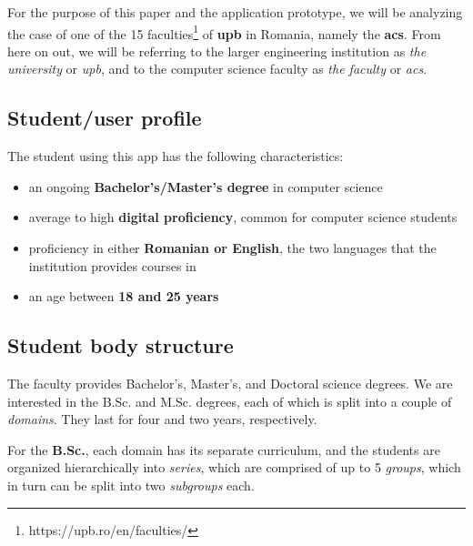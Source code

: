     For the purpose of this paper and the application prototype, we will be analyzing the case of one of the 15 faculties\footnote{https://upb.ro/en/faculties/} of \textbf{\acrlong{upb}} in Romania, namely the \textbf{\acrlong{acs}}. From here on out, we will be referring to the larger engineering institution as \textit{the university} or \textit{\acrshort{upb}}, and to the computer science faculty as \textit{the faculty} or \textit{\acrshort{acs}}.
    
    \subsection{Student/user profile} \label{2:student_profile}
    
        The student using this app has the following characteristics:
        \begin{itemize}
            \setlength{\topsep}{0.5pt}
            \setlength{\itemsep}{0.5pt}
            \setlength{\parsep}{0.5pt}
            \item an ongoing \textbf{Bachelor's/Master's degree} in computer science
            \item average to high \textbf{digital proficiency}, common for computer science students%
            \item proficiency in either \textbf{Romanian or English}, the two languages that the institution provides courses in%
            \item an age between \textbf{18 and 25 years}
        \end{itemize}
        
    \subsection{Student body structure} \label{1:student_body_structure}
    
        The faculty provides Bachelor's, Master's, and Doctoral science degrees. We are interested in the B.Sc. and M.Sc. degrees, each of which is split into a couple of \textit{domains}. They last for four and two years, respectively.
        
        For the \textbf{B.Sc.}, each domain has its separate curriculum, and the students are organized hierarchically into \textit{series}, which are comprised of up to 5 \textit{groups}, which in turn can be split into two \textit{subgroups} each.
        
